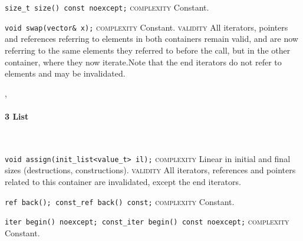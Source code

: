 \noindent{}\hspace*{0.25em}\lstinline[basicstyle=\ttfamily\color{cgreen}]{size_t size() const noexcept;} \textsc{complexity} Constant.\\\vspace{-0.6em}

\noindent{}\hspace*{0.25em}\lstinline[basicstyle=\ttfamily\color{cgreen}]{void swap(vector& x);} \textsc{complexity} Constant. \textsc{validity} All iterators, pointers and references referring to elements in both containers remain valid, and are now referring to the same elements they referred to before the call, but in the other container, where they now iterate.Note that the end iterators do not refer to elements and may be invalidated.\\\vspace{-0.6em}


\sep
{}
\paragraph{3 List}\mbox{}\vspace{0.5em}\\
\noindent{}\hspace*{0.25em}\lstinline[basicstyle=\ttfamily\color{corange}]{void assign(init_list<value_t> il);} \textsc{complexity} Linear in initial and final sizes (destructions, constructions). \textsc{validity} All iterators, references and pointers related to this container are invalidated, except the end iterators.\\\vspace{-0.6em}

\noindent{}\hspace*{0.25em}\lstinline[basicstyle=\ttfamily\color{cgreen}]{ref back(); const_ref back() const;} \textsc{complexity} Constant.\\\vspace{-0.6em}

\noindent{}\hspace*{0.25em}\lstinline[basicstyle=\ttfamily\color{cgreen}]{iter begin() noexcept; const_iter begin() const noexcept;} \textsc{complexity} Constant.\\\vspace{-0.6em}

